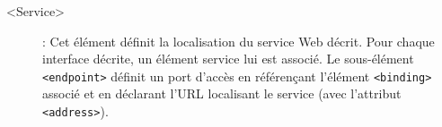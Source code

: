 \begin{description}

    \item[<Service>]: Cet élément définit la localisation du service Web
      décrit. Pour chaque interface décrite, un élément service lui est
      associé. Le sous-élément \texttt{<endpoint>} définit un port d’accès
      en référençant l’élément \texttt{<binding>} associé et en déclarant
      l'\textsc{URL} localisant le service (avec l’attribut
      \texttt{<address>}).



    \end{description}

